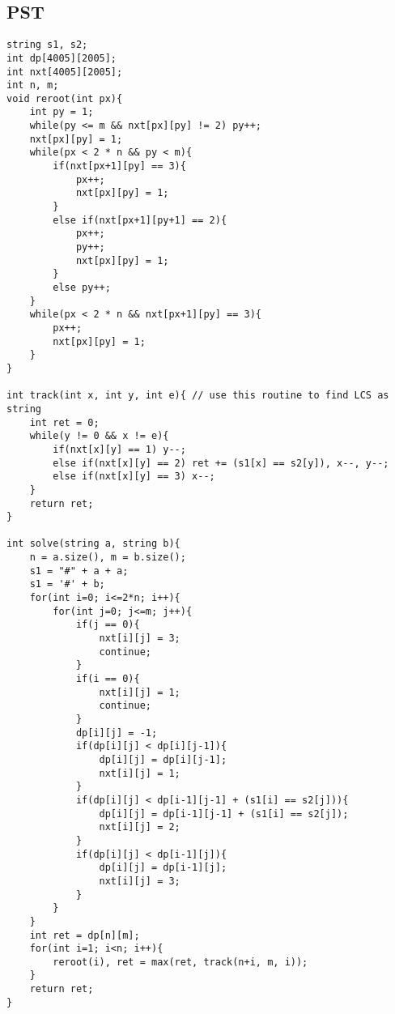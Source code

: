 \documentclass[landscape, 8pt, a4paper, oneside, twocolumn]{extarticle}
\begin{document}
\subsection{PST}
\begin{verbatim}
string s1, s2;
int dp[4005][2005];
int nxt[4005][2005];
int n, m;
void reroot(int px){
	int py = 1;
	while(py <= m && nxt[px][py] != 2) py++;
	nxt[px][py] = 1;
	while(px < 2 * n && py < m){
		if(nxt[px+1][py] == 3){
			px++;
			nxt[px][py] = 1;
		}
		else if(nxt[px+1][py+1] == 2){
			px++;
			py++;
			nxt[px][py] = 1;
		}
		else py++;
	}
	while(px < 2 * n && nxt[px+1][py] == 3){
		px++;
		nxt[px][py] = 1;
	}
}

int track(int x, int y, int e){ // use this routine to find LCS as string
	int ret = 0;
	while(y != 0 && x != e){
		if(nxt[x][y] == 1) y--;
		else if(nxt[x][y] == 2) ret += (s1[x] == s2[y]), x--, y--;
		else if(nxt[x][y] == 3) x--;
	}
	return ret;
}

int solve(string a, string b){
	n = a.size(), m = b.size();
	s1 = "#" + a + a;
	s1 = '#' + b;
	for(int i=0; i<=2*n; i++){
		for(int j=0; j<=m; j++){
			if(j == 0){
				nxt[i][j] = 3;
				continue;
			}
			if(i == 0){
				nxt[i][j] = 1;
				continue;
			}
			dp[i][j] = -1;
			if(dp[i][j] < dp[i][j-1]){
				dp[i][j] = dp[i][j-1];
				nxt[i][j] = 1;
			}
			if(dp[i][j] < dp[i-1][j-1] + (s1[i] == s2[j])){
				dp[i][j] = dp[i-1][j-1] + (s1[i] == s2[j]);
				nxt[i][j] = 2;
			}
			if(dp[i][j] < dp[i-1][j]){
				dp[i][j] = dp[i-1][j];
				nxt[i][j] = 3;
			}
		}
	}
	int ret = dp[n][m];
	for(int i=1; i<n; i++){
		reroot(i), ret = max(ret, track(n+i, m, i));
	}
	return ret;
}
\end{verbatim}
\end{document}
